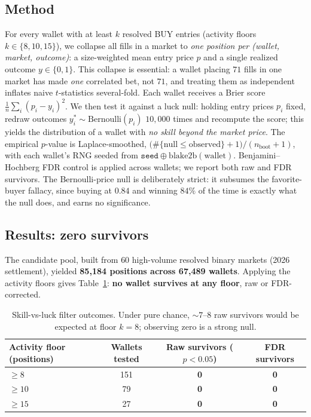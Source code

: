\documentclass[11pt]{article}
\begin{document}
\subsection{Method}
For every wallet with at least $k$ resolved BUY entries (activity floors $k\in\{8,10,15\}$),
we collapse all fills in a market to \emph{one position per (wallet, market, outcome)}: a
size-weighted mean entry price $p$ and a single realized outcome $y\in\{0,1\}$. This collapse
is essential: a wallet placing $71$ fills in one market has made \emph{one} correlated bet,
not $71$, and treating them as independent inflates naive $t$-statistics several-fold. Each
wallet receives a Brier score $\tfrac1n\sum_i (p_i-y_i)^2$. We then test it against a luck null:
holding entry prices $p_i$ fixed, redraw outcomes $y_i^\ast\sim\mathrm{Bernoulli}(p_i)$
$10{,}000$ times and recompute the score; this yields the distribution of a wallet with \emph{no skill
beyond the market price}. The empirical $p$-value is Laplace-smoothed,
$\bigl(\#\{\text{null}\le\text{observed}\}+1\bigr)/(n_{\text{boot}}+1)$, with each wallet's RNG
seeded from $\texttt{seed}\oplus\mathrm{blake2b}(\text{wallet})$. Benjamini--Hochberg FDR
control is applied across wallets; we report both raw and FDR survivors. The Bernoulli-price
null is deliberately strict: it subsumes the favorite-buyer fallacy, since buying at $0.84$ and
winning $84\%$ of the time is exactly what the null does, and earns no significance.

\subsection{Results: zero survivors}
The candidate pool, built from $60$ high-volume resolved binary markets (2026 settlement),
yielded \textbf{85{,}184 positions across 67{,}489 wallets}. Applying the activity floors gives
Table~\ref{tab:survivors}: \textbf{no wallet survives at any floor}, raw or FDR-corrected.

\begin{table}[h]
\centering
\caption{Skill-vs-luck filter outcomes. Under pure chance, ${\sim}7$--$8$ raw survivors would
be expected at floor $k=8$; observing zero is a strong null.}
\label{tab:survivors}
\small
\begin{tabular}{@{}lccc@{}}
\toprule
Activity floor (positions) & Wallets tested & Raw survivors ($p<0.05$) & FDR survivors \\
\midrule
$\ge 8$  & 151 & \textbf{0} & \textbf{0} \\
$\ge 10$ & 79  & \textbf{0} & \textbf{0} \\
$\ge 15$ & 27  & \textbf{0} & \textbf{0} \\
\bottomrule
\end{tabular}
\end{table}
\end{document}
